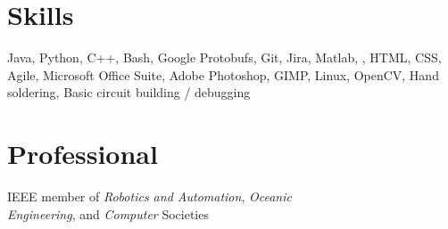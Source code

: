 \documentclass{article}
\begin{document}
{\begin{multicols}{2}
                \section*{Skills} 
                \noindent
                Java, Python, C++, Bash, Google Protobufs, Git, Jira, Matlab, \LaTeXe, HTML, CSS, Agile, Microsoft Office Suite, Adobe Photoshop, GIMP, Linux, OpenCV, Hand soldering, Basic circuit building / debugging
            \section*{Professional} 
                \noindent
                IEEE member of \textsl{Robotics and Automation}, \textsl{Oceanic \\Engineering}, and \textsl{Computer} Societies  
        \end{multicols}
    }
\end{document}
